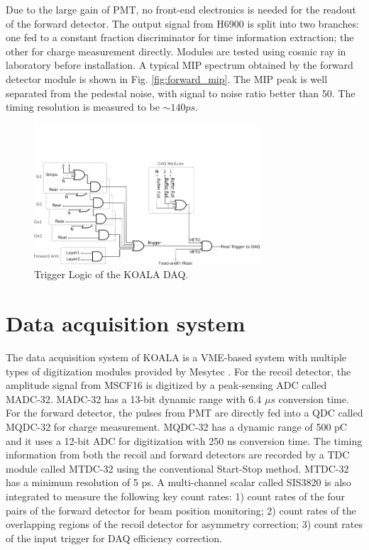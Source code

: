 \documentclass[number,5p]{elsarticle}
\begin{document}
Due to the large gain of PMT, no front-end electronics is needed for the readout of the forward detector.
The output signal from H6900 is split into two branches: one fed to a
constant fraction discriminator for time information extraction; the other for charge measurement directly.
Modules are tested using cosmic ray in laboratory before installation.
A typical MIP spectrum obtained by the forward detector module is shown in Fig. \ref{fig:forward_mip}. 
The MIP peak is well separated from the pedestal noise, with signal to noise ratio better than 50.
The timing resolution is measured to be $\sim140 ps$.

\begin{figure}[htbp]
  \centering
  \includegraphics[width=0.75\textwidth]{./trigger_logic.png}
  \caption{Trigger Logic of the KOALA DAQ.}
  \label{fig:trigger_logic}
\end{figure}

\section{Data acquisition system}
\label{sec:daq}

The data acquisition system of KOALA is a VME-based system with multiple types
of digitization modules provided by Mesytec \cite{mesytec}.
For the recoil detector, the amplitude signal from MSCF16 is digitized by a peak-sensing ADC called MADC-32.
MADC-32 has a 13-bit dynamic range with 6.4 \(\mu s\) conversion time.
For the forward detector, the pulses from PMT are directly fed into a QDC called MQDC-32 for charge measurement.
MQDC-32 has a dynamic range of 500 pC and it uses a 12-bit ADC for digitization with 250 ns conversion time.
The timing information from both the recoil and forward detectors are recorded by a TDC module called MTDC-32 using the conventional Start-Stop method.
MTDC-32 has a minimum resolution of 5 ps.
A multi-channel scalar called SIS3820 \cite{sis} is also integrated to measure
the following key count rates: 1) count rates of the four pairs of the forward detector for beam position monitoring; 2) count rates of the overlapping regions of the recoil detector for asymmetry correction; 3) count rates of the input trigger
for DAQ efficiency correction.
\end{document}
